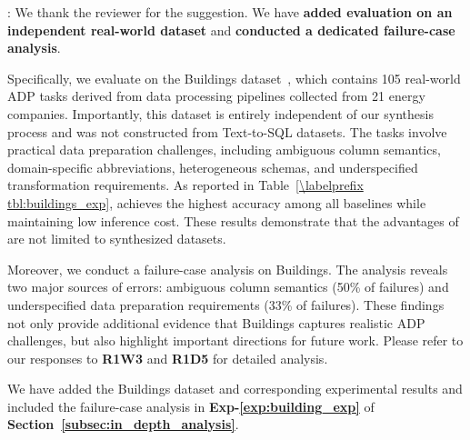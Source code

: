 :
We thank the reviewer for the suggestion. We have \textbf{added evaluation on an independent real-world dataset} and \textbf{conducted a dedicated failure-case analysis}.

Specifically, we evaluate \sys on the Buildings dataset~\cite{sharma2023automatic}, which contains 105 real-world ADP tasks derived from data processing pipelines collected from 21 energy companies. Importantly, this dataset is entirely independent of our synthesis process and was not constructed from Text-to-SQL datasets. The tasks involve practical data preparation challenges, including ambiguous column semantics, domain-specific abbreviations, heterogeneous schemas, and underspecified transformation requirements.
As reported in Table~\ref{\labelprefix tbl:buildings_exp}, \sys achieves the highest accuracy among all baselines while maintaining low inference cost. These results demonstrate that the advantages of \sys are not limited to synthesized datasets.

Moreover, we conduct a failure-case analysis on Buildings. The analysis reveals two major sources of errors: ambiguous column semantics (50\% of failures) and underspecified data preparation requirements (33\% of failures). These findings not only provide additional evidence that Buildings captures realistic ADP challenges, but also highlight important directions for future work.
Please refer to our responses to \textbf{R1W3} and \textbf{R1D5} for detailed analysis.

{
We have added the Buildings dataset and corresponding experimental results and included the failure-case analysis in \textbf{Exp-\ref{exp:building_exp}} of \textbf{Section~\ref{subsec:in_depth_analysis}}.
}

%
%



